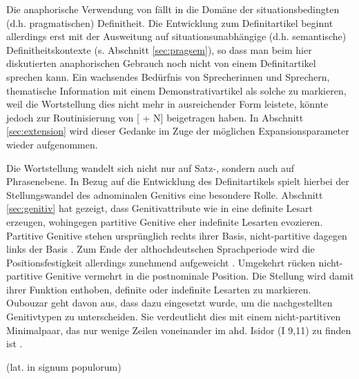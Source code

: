 \noindent
Die anaphorische Verwendung von  fällt in die Domäne der situationsbedingten (d.h. pragmatischen) Definitheit. Die Entwicklung zum Definitartikel beginnt allerdings erst mit der Ausweitung auf situationsunabhängige (d.h. semantische) Definitheitskontexte (s. Abschnitt \ref{sec:pragsem}), so dass man beim hier diskutierten anaphorischen Gebrauch noch nicht von einem Definitartikel sprechen kann. Ein wachsendes Bedürfnis von Sprecherinnen und Sprechern, thematische Information mit einem Demonstrativartikel als solche zu markieren, weil die Wortstellung dies nicht mehr in ausreichender Form leistete, könnte jedoch zur Routinisierung von [ + N] beigetragen haben. In Abschnitt \ref{sec:extension} wird dieser Gedanke im Zuge der möglichen Expan\-sions\-parameter wieder aufgenommen. 

Die Wortstellung wandelt sich nicht nur auf Satz-, sondern auch auf Phrasenebene. In Bezug auf die Entwicklung des Definitartikels spielt hierbei der Stellungswandel des adnominalen Genitivs eine besondere Rolle. Abschnitt \ref{sec:genitiv} hat gezeigt, dass Genitivattribute wie in  eine definite Lesart erzeugen, wohingegen partitive Genitive eher indefinite Lesarten evozieren. Partitive Genitive stehen ursprünglich rechts ihrer Basis, nicht-partitive dagegen links der Basis \parencite[177]{Behaghel1932}. Zum Ende der althochdeutschen Sprachperiode wird die Positionsfestigkeit allerdings zunehmend aufgeweicht \parencite[235]{Oubouzar1997}. Umgekehrt rücken nicht-partitive Genitive vermehrt in die postnominale Position. Die Stellung wird damit ihrer Funktion enthoben, definite oder indefinite Lesarten zu markieren. Oubouzar geht davon aus, dass  dazu eingesetzt wurde, um die nachgestellten Genitivtypen zu unterscheiden.  Sie verdeutlicht dies mit einem nicht-partitiven Minimalpaar, das nur wenige Zeilen voneinander im ahd. Isidor (I 9,11) zu finden ist \parencite[vgl.][79]{Oubouzar1992}.  
 

\begin{exe}
	\ex \label{ex:genitiv-stellung}  (lat. in signum populorum)
	\begin{xlist} 
		\ex \label{ex:gen-prae}   
		\ex \label{ex:gen-post}  		
		\end{xlist}
\end{exe}


